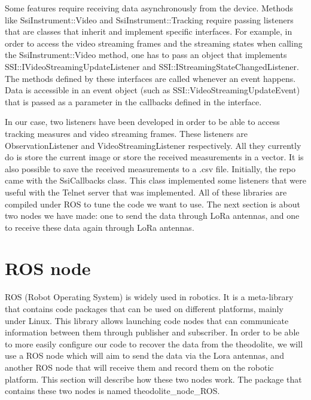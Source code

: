 \documentclass[10pt,letterpaper,oneside]{article}
\begin{document}
Some features require receiving data asynchronously from the device. 
Methods like SsiInstrument::Video and SsiInstrument::Tracking require passing listeners that are classes that inherit and implement specific interfaces. 
For example, in order to access the video streaming frames and the streaming states when calling the SsiInstrument::Video method, one has to pass an object that implements SSI::IVideoStreamingUpdateListener and SSI::IStreamingStateChangedListener. 
The methods defined by these interfaces are called whenever an event happens. 
Data is accessible in an event object (such as SSI::VideoStreamingUpdateEvent) that is passed as a parameter in the callbacks defined in the interface.

In our case, two listeners have been developed in order to be able to access tracking measures and video streaming frames. 
These listeners are ObservationListener and VideoStreamingListener respectively. 
All they currently do is store the current image or store the received measurements in a vector. 
It is also possible to save the received measurements to a .csv file.
Initially, the repo came with the SsiCallbacks class. 
This class implemented some listeners that were useful with the Telnet server that was implemented.
All of these libraries are compiled under ROS to tune the code we want to use.
The next section is about two nodes we have made: one to send the data through LoRa antennas, and one to receive these data again through LoRa antennas.


\section{ROS node}
\label{sec:ROS_node}

ROS (Robot Operating System) is widely used in robotics.
It is a meta-library that contains code packages that can be used on different platforms, mainly under Linux.
This library allows launching code nodes that can communicate information between them through publisher and subscriber.
In order to be able to more easily configure our code to recover the data from the theodolite, we will use a ROS node which will aim to send the data via the Lora antennas, and another ROS node that will receive them and record them on the robotic platform.
This section will describe how these two nodes work.
The package that contains these two nodes is named theodolite\_node\_ROS.
\end{document}
